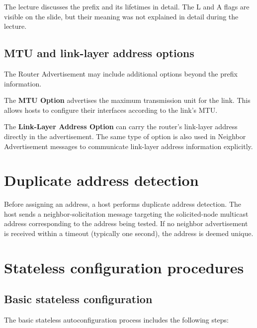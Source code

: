 The lecture discusses the prefix and its lifetimes in detail.
The L and A flags are visible on the slide, but their meaning was
not explained in detail during the lecture.


\subsection{MTU and link-layer address options}

The Router Advertisement may include additional options beyond the
prefix information.

The \textbf{MTU Option} advertises the maximum transmission unit
for the link. This allows hosts to configure their interfaces
according to the link's MTU.

\begin{center}
\end{center}


The \textbf{Link-Layer Address Option} can carry the router's
link-layer address directly in the advertisement. The same type
of option is also used in Neighbor Advertisement messages to
communicate link-layer address information explicitly.

\begin{center}
\end{center}

\section{Duplicate address detection}

Before assigning an address, a host performs duplicate address detection. The host sends a neighbor-solicitation message targeting the solicited-node multicast address corresponding to the address being tested. If no neighbor advertisement is received within a timeout (typically one second), the address is deemed unique.

\section{Stateless configuration procedures}

\subsection{Basic stateless configuration}

The basic stateless autoconfiguration process includes the following steps:

